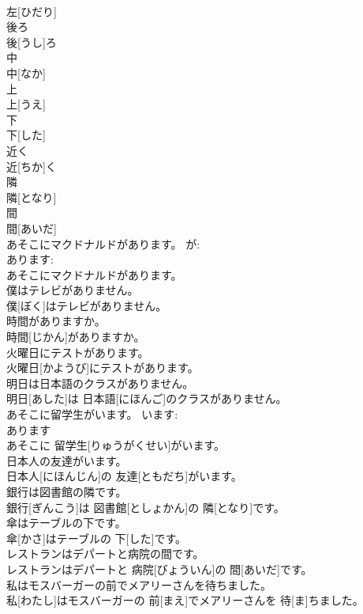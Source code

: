 \documentclass[8pt]{extreport}
\begin{document}
\begin{CJK}{UTF8}{min}
\\	左[ひだり]		
\\	後ろ	
\\	後[うし]ろ		
\\	中	
\\	中[なか]		
\\	上	
\\	上[うえ]		
\\	下	
\\	下[した]		
\\	近く	
\\	近[ちか]く		
\\	隣	
\\	隣[となり]		
\\	間	
\\	間[あいだ]		
\\	あそこにマクドナルドがあります。	が: 
\\	あります: 
\\	あそこにマクドナルドがあります。	
\\	僕はテレビがありません。	
\\	僕[ぼく]はテレビがありません。	
\\	時間がありますか。	
\\	時間[じかん]がありますか。	
\\	火曜日にテストがあります。	
\\	火曜日[かようび]にテストがあります。	
\\	明日は日本語のクラスがありません。	
\\	明日[あした]は 日本語[にほんご]のクラスがありません。	
\\	あそこに留学生がいます。	います: 
\\	あります 
\\	あそこに 留学生[りゅうがくせい]がいます。	
\\	日本人の友達がいます。	
\\	日本人[にほんじん]の 友達[ともだち]がいます。	
\\	銀行は図書館の隣です。	
\\	銀行[ぎんこう]は 図書館[としょかん]の 隣[となり]です。	
\\	傘はテーブルの下です。	
\\	傘[かさ]はテーブルの 下[した]です。	
\\	レストランはデパートと病院の間です。	
\\	レストランはデパートと 病院[びょういん]の 間[あいだ]です。	
\\	私はモスバーガーの前でメアリーさんを待ちました。	
\\	私[わたし]はモスバーガーの 前[まえ]でメアリーさんを 待[ま]ちました。	

\end{CJK}
\end{document}
